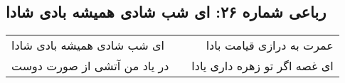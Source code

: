\begin{center}
\section*{رباعی شماره ۲۶: ای شب شادی همیشه بادی شادا}
\label{sec:0026}
\begin{longtable}{l p{0.5cm} r}
ای شب شادی همیشه بادی شادا
&&
عمرت به درازی قیامت بادا
\\
در یاد من آتشی از صورت دوست
&&
ای غصه اگر تو زهره داری یادا
\\
\end{longtable}
\end{center}

